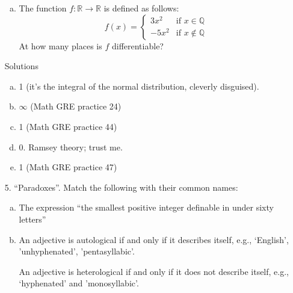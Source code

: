 \documentclass{article}
\begin{document}
\begin{itemize}
\begin{enumerate}[(a)]
      \item The function $f : \mathbb{R} \to \mathbb{R}$ is defined as
        follows:
        \[
          f(x) = \begin{cases}
            3x^2 &\text{if } x \in \mathbb{Q} \\
            -5x^2 &\text{if } x \notin \mathbb{Q}
          \end{cases}
        \]
        At how many places is $f$ differentiable?
    \end{enumerate}

    Solutions
    \begin{enumerate}[(a)]
      \item 1 (it's the integral of the normal distribution, cleverly
        disguised).
      \item $\infty$ (Math GRE practice 24)
      \item 1 (Math GRE practice 44)
      \item 0.  Ramsey theory; trust me.
      \item 1 (Math GRE practice 47)
    \end{enumerate}

\pagebreak

  \item[5.] ``Paradoxes''.  Match the following with their common names:
    \begin{enumerate}[(a)]
      \item The expression ``the smallest positive integer definable in
        under sixty letters''
      \item An adjective is autological if and only if it describes
        itself, e.g., `English', 'unhyphenated', 'pentasyllabic'.
        
        An adjective is heterological if and only if it does not
        describe itself, e.g., `hyphenated' and 'monosyllabic'.


\end{enumerate}
\end{itemize}
\end{document}
